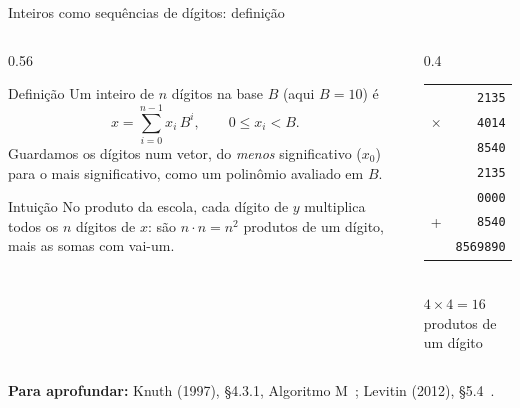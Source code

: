 \documentclass[aspectratio=169,xcolor=table]{beamer}
\newcommand{\fonte}[1]{%
  \vfill
  {\tiny\color{gray!55!black}\textbf{Para aprofundar:} #1\par}%
}
\begin{document}
\begin{frame}{Inteiros como sequências de dígitos: definição}
  \begin{columns}[c]
    \begin{column}{0.56\textwidth}
      \begin{block}{Definição}
        \scriptsize Um inteiro de $n$ dígitos na base $B$ (aqui $B=10$) é
        \[ x = \sum_{i=0}^{n-1} x_i\,B^{i}, \qquad 0\le x_i < B. \]
        Guardamos os dígitos num vetor, do \emph{menos} significativo ($x_0$) para o mais
        significativo, como um polinômio avaliado em $B$.
      \end{block}
      \begin{exampleblock}{Intuição}
        \scriptsize No produto da escola, cada dígito de $y$ multiplica todos os $n$ dígitos
        de $x$: são $n\cdot n = n^2$ produtos de um dígito, mais as somas com vai-um.
      \end{exampleblock}
    \end{column}
    \begin{column}{0.4\textwidth}
      \centering\small
      \begin{tabular}{@{}r@{\;}r@{}}
        & \texttt{2135} \\
        $\times$ & \texttt{4014} \\ \midrule
        & \texttt{8540} \\
        & \texttt{2135\phantom{0}} \\
        & \texttt{0000\phantom{00}} \\
        + & \texttt{8540\phantom{000}} \\ \midrule
        & \texttt{8569890}
      \end{tabular}
      \\[3pt]
      {\tiny $4\times 4 = 16$ produtos de um dígito}
    \end{column}
  \end{columns}
  \fonte{Knuth (1997), \S 4.3.1, Algoritmo M~\cite{knuth1997seminumerical};
    Levitin (2012), \S 5.4~\cite{levitin2012introduction}.}
\end{frame}
\end{document}
